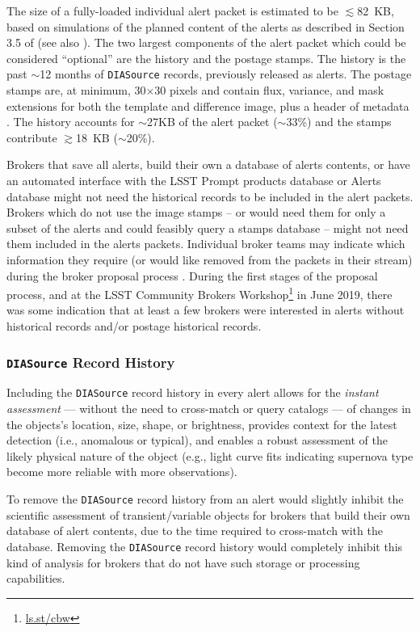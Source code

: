 \documentclass[DM,lsstdraft,authoryear,toc]{lsstdoc}
\begin{document}
The size of a fully-loaded individual alert packet is estimated to be $\lesssim$82~KB, based on simulations of the planned content of the alerts as described in Section 3.5 of  (see also ).
The two largest components of the alert packet which could be considered ``optional'' are the history and the postage stamps.
The history is the past $\sim$12 months of {\tt DIASource} records, previously released as alerts.
The postage stamps are, at minimum, 30$\times$30 pixels and contain flux, variance, and mask extensions for both the template and difference image, plus a header of metadata .
The history accounts for $\sim$27KB of the alert packet ($\sim$33\%) and the stamps contribute $\gtrsim$18~KB ($\sim$20\%). 

Brokers that save all alerts, build their own a database of alerts contents, or have an automated interface with the LSST Prompt products database or Alerts database might not need the historical records to be included in the alert packets.
Brokers which do not use the image stamps -- or would need them for only a subset of the alerts and could feasibly query a stamps database -- might not need them included in the alerts packets.
Individual broker teams may indicate which information they require (or would like removed from the packets in their stream) during the broker proposal process .
During the first stages of the proposal process, and at the LSST Community Brokers Workshop\footnote{\url{ls.st/cbw}} in June 2019, there was some indication that at least a few brokers were interested in alerts without historical records and/or postage historical records.

\subsubsection{{\tt DIASource} Record History}\label{sssec:packets_remove_hist}

Including the {\tt DIASource} record history in every alert allows for the \emph{instant assessment} --- without the need to cross-match or query catalogs --- of changes in the objects's location, size, shape, or brightness, provides context for the latest detection (i.e., anomalous or typical), and enables a robust assessment of the likely physical nature of the object (e.g., light curve fits indicating supernova type become more reliable with more observations). 

To remove the {\tt DIASource} record history from an alert would slightly inhibit the scientific assessment of transient/variable objects for brokers that build their own database of alert contents, due to the time required to cross-match with the database.
Removing the {\tt DIASource} record history would completely inhibit this kind of analysis for brokers that do not have such storage or processing capabilities.
\end{document}
